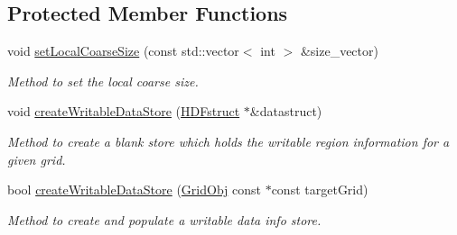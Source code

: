 \subsection*{Protected Member Functions}
\begin{DoxyCompactItemize}
\item 
void \hyperlink{class_grid_manager_a2c3e773f4c9a6b86a268a6509470c7c6}{set\+Local\+Coarse\+Size} (const std\+::vector$<$ int $>$ \&size\+\_\+vector)
\begin{DoxyCompactList}\small\item\em Method to set the local coarse size. \end{DoxyCompactList}\item 
void \hyperlink{class_grid_manager_abfcd828cbd33d4b8bb8d50dd7b2ac189}{create\+Writable\+Data\+Store} (\hyperlink{struct_h_d_fstruct}{H\+D\+Fstruct} $\ast$\&datastruct)
\begin{DoxyCompactList}\small\item\em Method to create a blank store which holds the writable region information for a given grid. \end{DoxyCompactList}\item 
bool \hyperlink{class_grid_manager_a19e1e7c6646d9158b1b2e46ae2db8468}{create\+Writable\+Data\+Store} (\hyperlink{class_grid_obj}{Grid\+Obj} const $\ast$const target\+Grid)
\begin{DoxyCompactList}\small\item\em Method to create and populate a writable data info store. \end{DoxyCompactList}\end{DoxyCompactItemize}
